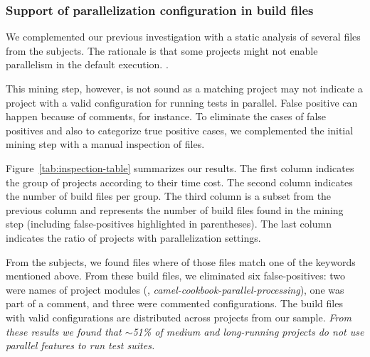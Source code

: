 
\subsubsection{Support of parallelization configuration in build files}

We complemented our previous investigation with a static analysis of
several \pomf{} files from the \numMedLong{} subjects. The rationale
is that some projects might not enable parallelism in the default
execution. .


This mining step, however, is not sound as a matching project may not
indicate a project with a valid configuration for running tests in
parallel.  False positive can happen because of comments, for
instance.  To eliminate the cases of false positives and also to
categorize true positive cases, we complemented the initial mining
step with a manual inspection of files.


Figure~\ref{tab:inspection-table} summarizes our results. The first
column indicates the group of projects according to their time cost.
The second column indicates the number of build files per group.  The
third column is a subset from the previous column and represents the
number of build files found in the mining step (including
false-positives highlighted in parentheses). The last column indicates
the ratio of projects with parallelization settings.

From the \numMedLong{} subjects, we found \pomMedLong{} \pomf{} files
where \numPomMatched{} of those files match one of the keywords
mentioned above.  From these \numPomMatched{} build files, we
eliminated six false-positives: two were names of project modules
(\eg, \emph{camel-cookbook-parallel-processing}), one was part of a
comment, and three were commented configurations. The
\numPomMatchedValid{} build files with valid configurations are
distributed across \numProjectsPar{} projects from our sample.
\emph{From these results we found that $\sim$51\% of medium and
long-running projects do not use parallel features to run test
suites.}


